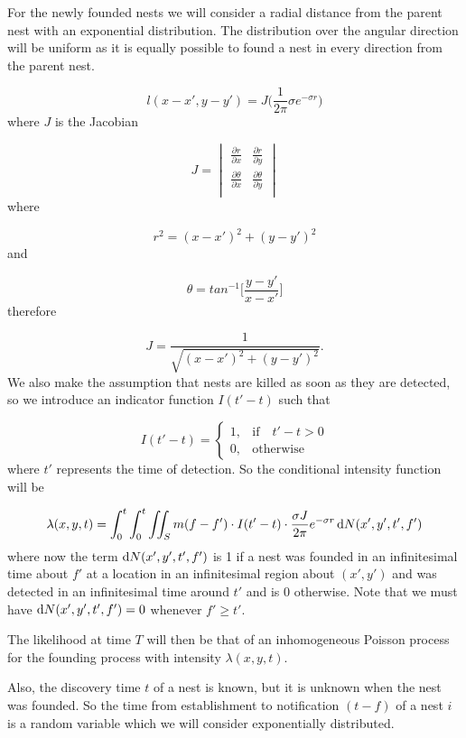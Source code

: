 For the newly founded nests we will consider a radial distance from the parent nest with an exponential distribution. The distribution over the angular direction will be uniform as it is equally possible to found a nest in every direction from the parent nest.

\begin{equation}
l(x - x', y - y')= J \bigg(\frac{1}{2 \pi} \sigma e^{- \sigma r}\bigg)
\end{equation}
where $J$ is the Jacobian

\[
J =  
\begin{vmatrix}
	\frac{\partial r}{\partial x} & \frac{\partial r}{\partial y} \\
	\frac{\partial \theta}{\partial x} & \frac{\partial \theta}{\partial y} \\
\end{vmatrix}
\]
where

\[
r^{2} = (x - x')^{2} + (y - y')^{2}
\]
and

\[
\theta = tan^{-1} \Bigg [\frac{y - y'}{x - x'} \Bigg ]
\]
therefore

\[
J = \frac{1}{\sqrt{(x - x')^{2} + (y - y')^{2}}}.
\]
We also make the assumption that nests are killed as soon as they are detected, so we introduce an indicator function $I(t' - t)$ such that

\[
I (t' - t) =
\begin{cases}
1, & \mbox{if} \quad t' -  t> 0 \\
0, & \mbox{otherwise}
\end{cases}
\]
where $t'$ represents the time of detection. So the conditional intensity function will be

\[
\lambda(x, y, t) = \int_{0}^{t} \int_{0}^{t} \iint_{S} m(f - f') \cdot I(t' - t)\cdot \frac{\sigma J }{2 \pi} e^{- \sigma r} \operatorname{d}\!{N}(x',y',t',f')
\]
where now the term $\operatorname{d}\!{N}(x',y',t',f')$ is 1 if a nest was founded in an infinitesimal time about $f'$ at a location in an infinitesimal region about $(x', y')$ and was detected in an infinitesimal time around $t'$ and is $0$ otherwise. Note that we must have $\operatorname{d}\!{N}(x',y',t',f')=0$ whenever $f' \geq t'$.

The likelihood at time $T$ will then be that of  an inhomogeneous Poisson process for the founding process with intensity $\lambda(x, y, t)$.

Also, the discovery time $t$ of a nest is known, but it is unknown when the nest was founded. So the time from establishment to notification $(t - f)$ of a nest $i$ is a random variable which we will consider exponentially distributed.

